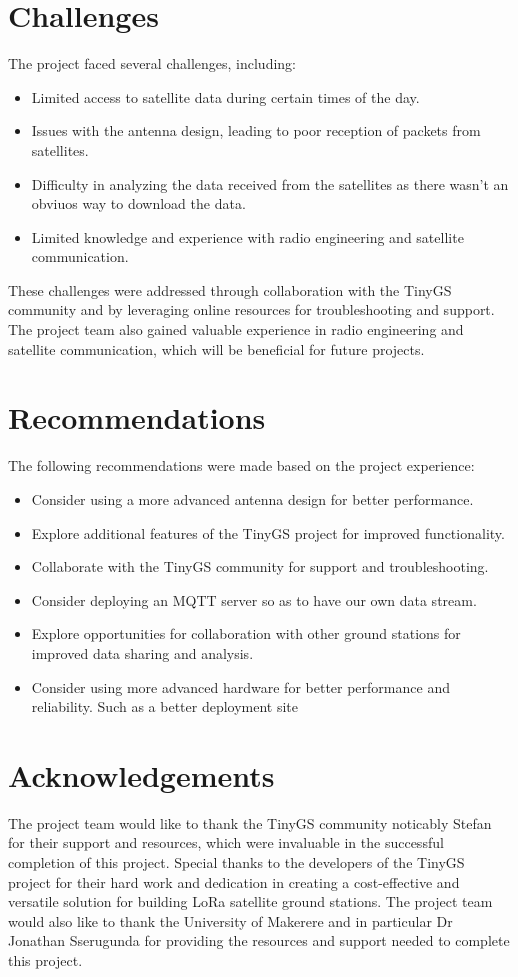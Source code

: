 \documentclass[12pt,a4paper]{article}
\begin{document}
\section{Challenges}
The project faced several challenges, including:
\begin{itemize}
    \item Limited access to satellite data during certain times of the day.
    \item Issues with the antenna design, leading to poor reception of packets from satellites.
    \item Difficulty in analyzing the data received from the satellites as there wasn't an obviuos way to download the data.
    \item Limited knowledge and experience with radio engineering and satellite communication.
\end{itemize}
These challenges were addressed through collaboration with the TinyGS community and by leveraging online resources for troubleshooting and support. The project team also gained valuable experience in radio engineering and satellite communication, which will be beneficial for future projects.
\section{Recommendations}
The following recommendations were made based on the project experience:
\begin{itemize}
    \item Consider using a more advanced antenna design for better performance.
    \item Explore additional features of the TinyGS project for improved functionality.
    \item Collaborate with the TinyGS community for support and troubleshooting.
    \item Consider deploying an MQTT server so as to have our own data stream.
    \item Explore opportunities for collaboration with other ground stations for improved data sharing and analysis.
    \item Consider using more advanced hardware for better performance and reliability. Such as a better deployment site
\end{itemize}
\section{Acknowledgements}
The project team would like to thank the TinyGS community noticably Stefan for their support and resources, which were invaluable in the successful completion of this project. Special thanks to the developers of the TinyGS project for their hard work and dedication in creating a cost-effective and versatile solution for building LoRa satellite ground stations.
The project team would also like to thank the University of Makerere and in particular Dr Jonathan Sserugunda for providing the resources and support needed to complete this project.
\end{document}
